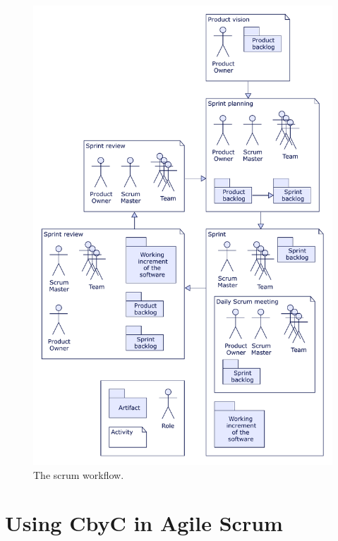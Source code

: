 \begin{figure}[H]
	\centering
	\includegraphics[scale=0.75]{Figures/Scrum_workflow.pdf}
	\decoRule
	\caption{The scrum workflow.}
	\label{fig:ScrumWorkflow}
\end{figure}

\section{Using CbyC in Agile Scrum}


